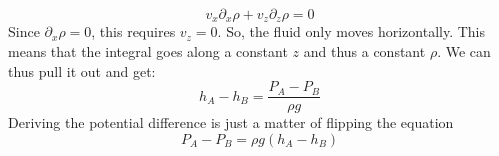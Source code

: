 \documentclass{article}
\begin{document}
\begin{equation}
    v_x \partial_x \rho + v_z \partial_z \rho = 0
\end{equation}
Since $\partial_x \rho = 0$, this requires $v_z = 0$. So, the fluid only moves horizontally. This means that the integral goes along a constant $z$ and thus a constant $\rho$. We can thus pull it out and get:
\begin{equation}
    \boxed{h_A - h_B = \frac{P_A - P_B}{\rho g}}
\end{equation}
Deriving the potential difference is just a matter of flipping the equation
\begin{equation}
    \boxed{P_A - P_B = \rho g\left(h_A - h_B\right)}
\end{equation}
\end{document}
